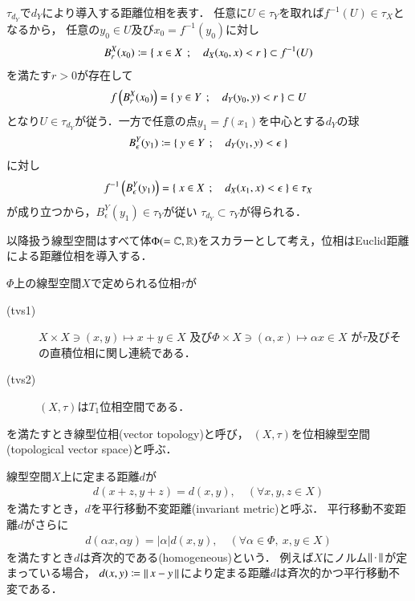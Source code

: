 	\begin{prf}
		$\tau_{d_Y}$で$d_Y$により導入する距離位相を表す．
		任意に$U \in \tau_Y$を取れば$f^{-1}(U) \in \tau_X$となるから，
		任意の$y_0 \in U$及び$x_0 = f^{-1}(y_0)$に対し
		\begin{align}
			B^X_r(x_0) \coloneqq \left\{\ x \in X\ \, ; \quad d_X(x_0,x) < r\ \right\} \subset f^{-1}(U)
		\end{align}
		を満たす$r > 0$が存在して
		\begin{align}
			f\left(B^X_r(x_0)\right) = \left\{\ y \in Y\ \, ; \quad d_Y(y_0,y) < r\ \right\} \subset U
		\end{align}
		となり$U \in \tau_{d_Y}$が従う．一方で任意の点$y_1 = f(x_1)$を中心とする$d_Y$の球
		\begin{align}
			B^Y_\epsilon (y_1) \coloneqq \left\{\ y \in Y\ \, ; \quad d_Y(y_1,y) < \epsilon\ \right\}
		\end{align}
		に対し
		\begin{align}
			f^{-1}\left(B^Y_\epsilon (y_1)\right)
			= \left\{\ x \in X\ \, ; \quad d_X(x_1,x) < \epsilon\ \right\} \in \tau_X
		\end{align}
		が成り立つから，$B^Y_\epsilon (y_1) \in \tau_Y$が従い
		$\tau_{d_Y} \subset \tau_Y$が得られる．
		\QED
	\end{prf}
	
	以降扱う線型空間はすべて体$\Phi (=\mathbb{C},\mathbb{R})$をスカラーとして考え，位相はEuclid距離による距離位相を導入する．
	
	\begin{screen}
		\begin{dfn}[位相線型空間]\label{def:topological_vector_space}
			$\Phi$上の線型空間$X$で定められる位相$\tau$が
			\begin{description}
				\item[(tvs1)] $X \times X \ni (x,y) \longmapsto x+y \in X$
					及び$\Phi \times X \ni (\alpha,x) \longmapsto \alpha x \in X$
					が$\tau$及びその直積位相に関し連続である．
				\item[(tvs2)]
					$(X,\tau)$は$T_1$位相空間である．
			\end{description}
			を満たすとき線型位相(vector topology)と呼び，
			$(X,\tau)$を位相線型空間(topological vector space)と呼ぶ．
		\end{dfn}
	\end{screen}
	
	\begin{screen}
		\begin{dfn}[平行移動不変距離]
			線型空間$X$上に定まる距離$d$が
			\begin{align}
				d(x+z, y+z) = d(x,y),\quad (\forall x,y,z \in X)
			\end{align}
			を満たすとき，$d$を平行移動不変距離(invariant metric)と呼ぶ．
			平行移動不変距離$d$がさらに
			\begin{align}
				d(\alpha x, \alpha y) = |\alpha| d(x,y),
				\quad (\forall \alpha \in \Phi,\ x,y \in X)
			\end{align}
			を満たすとき$d$は斉次的である(homogeneous)という．
			例えば$X$にノルム$\left\|\, \cdot\, \right\|_{}$が定まっている場合，
			$d(x,y) \coloneqq \left\|\, x-y\, \right\|_{}$により定まる距離$d$は斉次的かつ平行移動不変である．
		\end{dfn}
	\end{screen}
	
